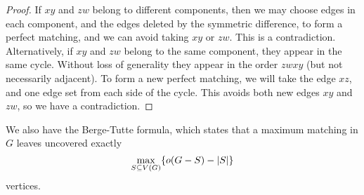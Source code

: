 \begin{proof}
  If $xy$ and $zw$ belong to different components, then we may choose edges in
  each component, and the edges deleted by the symmetric difference, to form a
  perfect matching, and we can avoid taking $xy$ or $zw$.
  This is a contradiction.
  Alternatively, if $xy$ and $zw$ belong to the same component, they appear in
  the same cycle.
  Without loss of generality they appear in the order $zwxy$ (but not
  necessarily adjacent).
  To form a new perfect matching, we will take the edge $xz$, and one edge set
  from each side of the cycle.
  This avoids both new edges $xy$ and $zw$, so we have a contradiction.
\end{proof}

We also have the Berge-Tutte formula, which states that a maximum matching in
$G$ leaves uncovered exactly
\[
  \max_{S \subseteq V(G)} \{o(G - S) - \left| S \right|\}
\]
vertices.


